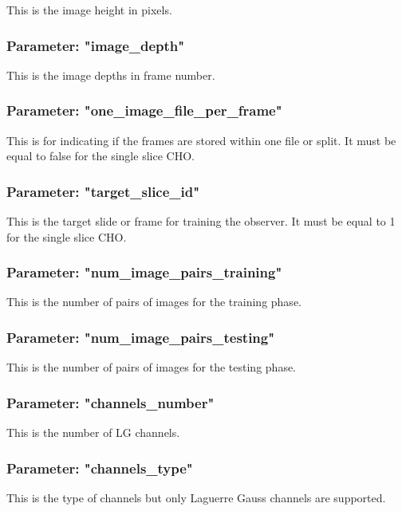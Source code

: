 This is the image height in pixels.

\subsubsection{Parameter: "image\_depth"}

This is the image depths in frame number.

\subsubsection{Parameter: "one\_image\_file\_per\_frame"}

This is for indicating if the frames are stored within one file or split.  It must be equal to false for the single slice CHO.

\subsubsection{Parameter: "target\_slice\_id"}

This is the target slide or frame for training the observer. It must be equal to 1 for the single slice CHO.

\subsubsection{Parameter: "num\_image\_pairs\_training"}

This is the number of pairs of images for the training phase.

\subsubsection{Parameter: "num\_image\_pairs\_testing"}

This is the number of pairs of images for the testing phase.

\subsubsection{Parameter: "channels\_number"}

This is the number of LG channels.

\subsubsection{Parameter: "channels\_type"}

This is the type of channels but only Laguerre Gauss channels are supported.

